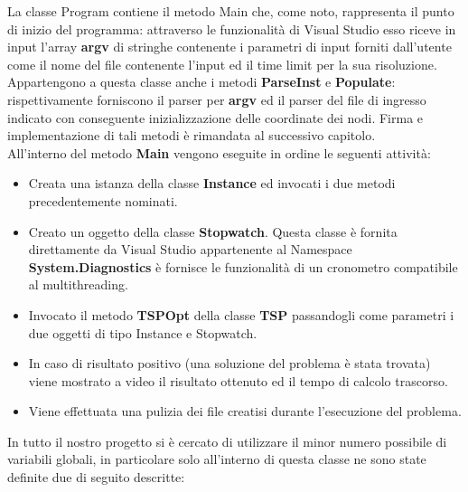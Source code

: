 \documentclass[11pt]{article}
\begin{document}
La classe Program contiene il metodo Main che, come noto, rappresenta il punto di inizio del programma: attraverso le funzionalità di Visual Studio esso riceve in input l'array \textbf{argv} di stringhe contenente i parametri di input forniti dall'utente come il nome del file contenente l'input ed il time limit per la sua risoluzione. Appartengono a questa classe anche i metodi \textbf{ParseInst} e \textbf{Populate}: rispettivamente forniscono il parser per \textbf{argv} ed il parser del file di ingresso indicato con conseguente inizializzazione delle coordinate dei nodi. Firma e implementazione di tali metodi è rimandata al successivo capitolo.\\
All'interno del metodo \textbf{Main} vengono eseguite in ordine le seguenti attività:
\begin{itemize}
    \item Creata una istanza della classe \textbf{Instance} ed invocati i due metodi precedentemente nominati.
    \item Creato un oggetto della classe \textbf{Stopwatch}. Questa classe è fornita direttamente da Visual Studio appartenente al Namespace \textbf{System.Diagnostics} è fornisce le funzionalità di un cronometro compatibile al multithreading.
    \item Invocato il metodo \textbf{TSPOpt} della classe \textbf{TSP} passandogli come parametri i due oggetti di tipo Instance e Stopwatch.
    \item In caso di risultato positivo (una soluzione del problema è stata trovata) viene mostrato a video il risultato ottenuto ed il tempo di calcolo trascorso.
    \item Viene effettuata una pulizia dei file creatisi durante l'esecuzione del problema.
\end{itemize}

In tutto il nostro progetto si è cercato di utilizzare il minor numero possibile di variabili globali, in particolare solo all'interno di questa classe ne sono state definite due di seguito descritte:
\end{document}
